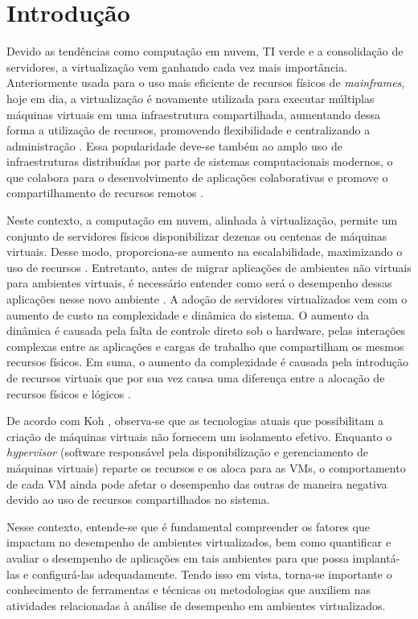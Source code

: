 \section{Introdução}

Devido as tendências como computação em nuvem, TI verde e a consolidação de servidores, a virtualização vem ganhando cada vez mais importância. Anteriormente usada para o uso mais eficiente de recursos físicos de \textit{mainframes}, hoje em dia, a virtualização é novamente utilizada para executar múltiplas máquinas virtuais em uma infraestrutura compartilhada, aumentando dessa forma a utilização de recursos, promovendo flexibilidade e centralizando a administração \cite{huber2011}. Essa popularidade deve-se também ao amplo uso de infraestruturas distribuídas por parte de sistemas computacionais modernos, o que colabora para o desenvolvimento de aplicações colaborativas e promove o compartilhamento de recursos remotos \cite{popiolek2012}.

Neste contexto, a computação em nuvem, alinhada à virtualização, permite um conjunto de servidores físicos disponibilizar dezenas ou centenas de máquinas virtuais. Desse modo, proporciona-se aumento na escalabilidade, maximizando o uso de recursos \cite{popiolek2012}. Entretanto, antes de migrar aplicações de ambientes não virtuais para ambientes virtuais, é necessário entender como será o desempenho dessas aplicações nesse novo ambiente \cite{benevuto2006}. A adoção de servidores virtualizados vem com o aumento de custo na complexidade e dinâmica do sistema. O aumento da dinâmica é causada pela falta de controle direto sob o hardware, pelas interações complexas entre as aplicações e cargas de trabalho que compartilham os mesmos recursos físicos. Em suma, o aumento da complexidade é causada pela introdução de recursos virtuais que por sua vez causa uma diferença entre a alocação de recursos físicos e lógicos \cite{huber2011}.

De acordo com Koh \cite{koh2007}, observa-se que as tecnologias atuais que possibilitam a criação de máquinas virtuais não fornecem um isolamento efetivo. Enquanto o \textit{hypervisor} (software responsável pela disponibilização e gerenciamento de máquinas virtuais) reparte os recursos e os aloca para as VMs, o comportamento de cada VM ainda pode afetar o desempenho das outras de maneira negativa devido ao uso de recursos compartilhados no sistema.

Nesse contexto, entende-se que é fundamental compreender os fatores que impactam no desempenho de ambientes virtualizados, bem como quantificar e avaliar o desempenho de aplicações em tais ambientes para que possa implantá-las e configurá-las adequadamente. Tendo isso em vista, torna-se importante o conhecimento de ferramentas e técnicas ou metodologias que auxiliem nas atividades relacionadas à análise de desempenho em ambientes virtualizados.

